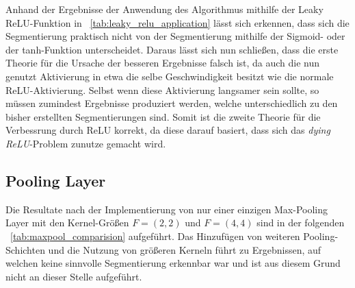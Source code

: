 Anhand der Ergebnisse der Anwendung des Algorithmus mithilfe der Leaky ReLU-Funktion in \tablename~\ref{tab:leaky_relu_application} lässt sich erkennen, dass sich die Segmentierung praktisch nicht von der Segmentierung mithilfe der Sigmoid- oder der tanh-Funktion unterscheidet. Daraus lässt sich nun schließen, dass die erste Theorie für die Ursache der besseren Ergebnisse falsch ist, da auch die nun genutzt Aktivierung in etwa die selbe Geschwindigkeit besitzt wie die normale ReLU-Aktivierung. Selbst wenn diese Aktivierung langsamer sein sollte, so müssen zumindest Ergebnisse produziert werden, welche unterschiedlich zu den bisher erstellten Segmentierungen sind. Somit ist die zweite Theorie für die Verbessrung durch ReLU korrekt, da diese darauf basiert, dass sich das \textit{dying ReLU}-Problem zunutze gemacht wird.

\subsection{Pooling Layer}
\label{ssec:exp_architecture_pooling}

Die Resultate nach der Implementierung von nur einer einzigen Max-Pooling Layer mit den Kernel-Größen $F=(2, 2)$ und $F=(4, 4)$ sind in der folgenden \tablename~\ref{tab:maxpool_comparision} aufgeführt. Das Hinzufügen von weiteren Pooling-Schichten und die Nutzung von größeren Kerneln führt zu Ergebnissen, auf welchen keine sinnvolle Segmentierung erkennbar war und ist aus diesem Grund nicht an dieser Stelle aufgeführt.

